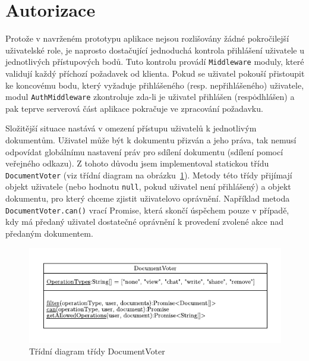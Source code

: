 
\section{Autorizace}\label{sec:autorizace}

Protože v navrženém prototypu aplikace nejsou rozlišovány žádné pokročilejší uživatelské role, je naprosto dostačující jednoduchá kontrola přihlášení uživatele u jednotlivých přístupových bodů.
Tuto kontrolu provádí \texttt{Middleware} moduly, které validují každý příchozí požadavek od klienta.
Pokud se uživatel pokouší přistoupit ke koncovému bodu, který vyžaduje přihlášeného (resp. nepřihlášeného) uživatele, modul \texttt{AuthMiddleware} zkontroluje zda-li je uživatel přihlášen (resp\. odhlášen) a pak teprve serverová část aplikace pokračuje ve zpracování požadavku.

Složitější situace nastává v omezení přístupu uživatelů k jednotlivým dokumentům.
Uživatel může být k dokumentu přizván a jeho práva, tak nemusí odpovídat globálnímu nastavení práv pro sdílení dokumentu (sdílení pomocí veřejného odkazu).
Z tohoto důvodu jsem implementoval statickou třídu \texttt{DocumentVoter} (viz třídní diagram na obrázku~\ref{fig:DocumentVoter}).
Metody této třídy přijímají objekt uživatele (nebo hodnotu \texttt{null}, pokud uživatel není přihlášený) a objekt dokumentu, pro který chceme zjistit uživatelovo oprávnění.
Například metoda \texttt{DocumentVoter.can()} vrací Promise, která skončí úspěchem pouze v případě, kdy má předaný uživatel dostatečné oprávnění k provedení zvolené akce nad předaným dokumentem.

\begin{figure}[ht!]
    \centering
    \includegraphics[width=\textwidth]{partials/realizace/DocumentVoter.pdf}
    \caption{Třídní diagram třídy DocumentVoter}\label{fig:DocumentVoter}
\end{figure}

